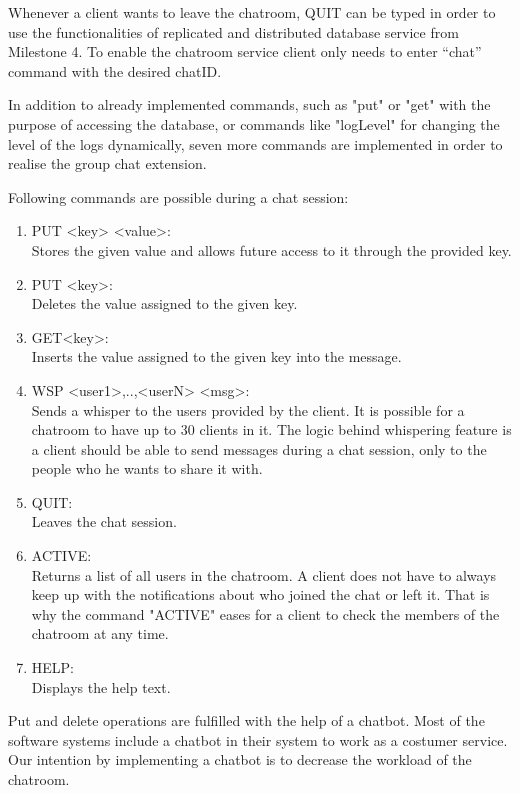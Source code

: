 Whenever a client wants to leave the chatroom, QUIT can be typed in order to use the functionalities of replicated and distributed database service from Milestone 4. To enable the chatroom service client only needs to enter “chat” command with the desired chatID. 

In addition to already implemented commands, such as "put" or "get" with the purpose of accessing the database, or commands like "logLevel" for changing the level of the logs dynamically, seven more commands are implemented in order to realise the group chat extension.

Following commands are possible during a chat session:
\begin{enumerate}
  \item 	PUT <key> <value>: \\
Stores the given value and allows future access to it through the provided key. 
  \item PUT <key>:\\
Deletes the value assigned to the given key.
  \item GET{<key>}:\\
Inserts the value assigned to the given key into the message.
  \item WSP <user1>,..,<userN> <msg>:\\
Sends a whisper to the users provided by the client. It is possible for a chatroom to have up to 30 clients in it. The logic behind whispering feature is a client should be able to send messages during a chat session, only to the people who he wants to share it with.  
  \item QUIT:\\
  Leaves the chat session.
  \item ACTIVE:\\
   Returns a list of all users in the chatroom. A client does not have to always keep up with the notifications about who joined the chat or left it. That is why the command "ACTIVE" eases for a client to check the members of the chatroom at any time.
  \item HELP:\\
  Displays the help text.
\end{enumerate}

Put and delete operations are fulfilled with the help of a chatbot. Most of the software systems include a chatbot in their system to work as a costumer service. Our intention by implementing a chatbot is to decrease the workload of the chatroom.

